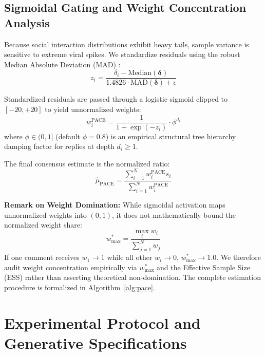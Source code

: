 \documentclass[journal]{IEEEtran}
\begin{document}
\subsection{Sigmoidal Gating and Weight Concentration Analysis}
Because social interaction distributions exhibit heavy tails, sample variance is sensitive to extreme viral spikes. We standardize residuals using the robust Median Absolute Deviation (MAD) \cite{huber1981robust, rousseeuw1993alternatives}:
\begin{equation}
z_i = \frac{\delta_i - \text{Median}(\boldsymbol{\delta})}{1.4826 \cdot \text{MAD}(\boldsymbol{\delta}) + \epsilon}
\end{equation}

Standardized residuals are passed through a logistic sigmoid clipped to $[-20, +20]$ to yield unnormalized weights:
\begin{equation}
w_i^{\text{PACE}} = \frac{1}{1 + \exp(-z_i)} \cdot \phi^{d_i}
\end{equation}
where $\phi \in (0, 1]$ (default $\phi = 0.8$) is an empirical structural tree hierarchy damping factor for replies at depth $d_i \ge 1$.

The final consensus estimate is the normalized ratio:
\begin{equation}
\hat{\mu}_{\text{PACE}} = \frac{\sum_{i=1}^N w_i^{\text{PACE}} s_i}{\sum_{i=1}^N w_i^{\text{PACE}}}
\end{equation}

\textbf{Remark on Weight Domination:} While sigmoidal activation maps unnormalized weights into $(0, 1)$, it does not mathematically bound the normalized weight share:
\begin{equation}
w_{\max}^* = \frac{\max_i w_i}{\sum_{j=1}^N w_j}
\end{equation}
If one comment receives $w_1 \to 1$ while all other $w_i \to 0$, $w_{\max}^* \to 1.0$. We therefore audit weight concentration empirically via $w_{\max}^*$ and the Effective Sample Size (ESS) rather than asserting theoretical non-domination. The complete estimation procedure is formalized in Algorithm~\ref{alg:pace}.

\section{Experimental Protocol and Generative Specifications}
\end{document}
